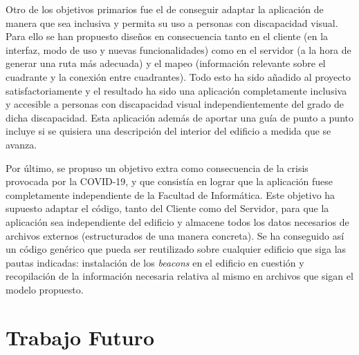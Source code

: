 Otro de los objetivos primarios fue el de conseguir adaptar la aplicación de manera que sea inclusiva y permita su uso a personas con discapacidad visual. Para ello se han propuesto diseños en consecuencia tanto en el cliente (en la interfaz, modo de uso y nuevas funcionalidades) como en el servidor (a la hora de generar una ruta más adecuada) y el mapeo (información relevante sobre el cuadrante y la conexión entre cuadrantes). Todo esto ha sido añadido al proyecto satisfactoriamente y el resultado ha sido una aplicación completamente inclusiva y accesible a personas con discapacidad visual independientemente del grado de dicha discapacidad. Esta aplicación además de aportar una guía de punto a punto incluye si se quisiera una descripción del interior del edificio a medida que se avanza.

Por último, se propuso un objetivo extra como consecuencia de la crisis provocada por la COVID-19, y que consistía en lograr que la aplicación fuese completamente independiente de la Facultad de Informática. Este objetivo ha supuesto adaptar el código, tanto del Cliente como del Servidor, para que la aplicación sea independiente del edificio y almacene todos los datos necesarios de archivos externos (estructurados de una manera concreta). Se ha conseguido así un código genérico que pueda ser reutilizado sobre cualquier edificio que siga las pautas indicadas: instalación de los \textit{beacons} en el edificio en cuestión y recopilación de la información necesaria relativa al mismo en archivos que sigan el modelo propuesto.

\section{Trabajo Futuro}
\label{sec:trabajoFuturo}

